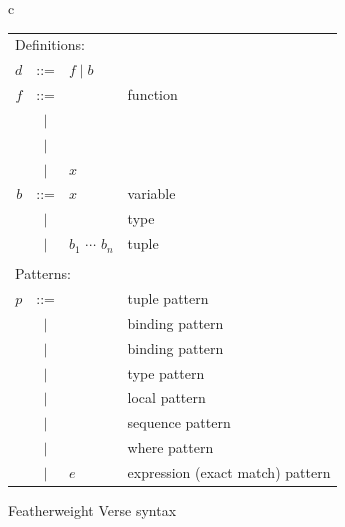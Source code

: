 \documentclass[acmsmall,review,anonymous,dvipsnames]{acmart}\settopmatter{printfolios=true,printccs=false,printacmref=false}
\newcommand{\vtt}[1]{\text{\tt #1}}
\newcommand{\eff}{\mathit{eff}}   %
\begin{document}
\begin{figure}
\begin{tabular}{c}
\begin{tabular}{rcll}
  \\
  \multicolumn{3}{l}{Definitions:} \\
  $d$ & ::= & $f \mid b$ \\
  $f$ & ::= & \vtt{$f$($p$)} & function \\
  & $\mid$ & \vtt{$f$ : $t$} \\
  & $\mid$ & \vtt{$f$ $\eff$} \\
  & $\mid$ & $x$ & \\
  $b$ & ::= & $x$ & variable \\
  & $\mid$ & \vtt{$b$ : $t$} & type \\
  & $\mid$ & $b_1$\vtt{,} $\cdots$\vtt{,} $b_n$ & tuple \\
  \\
  \multicolumn{3}{l}{Patterns:} \\
  $p$ & ::= & \vtt{$p_1$,$\cdots$,$p_n$} & tuple pattern \\
  & $\mid$ & \vtt{$d$ : $t$} & binding pattern \\
  & $\mid$ & \vtt{$d$ := $e$} & binding pattern \\
  & $\mid$ & \vtt{: $t$} & type pattern \\
  & $\mid$ & \vtt{let ($e$) in $p$} & local pattern \\
  & $\mid$ & \vtt{$e$ ; $p$} & sequence pattern \\
  & $\mid$ & \vtt{$p$ where $e$} & where pattern \\
  & $\mid$ & $e$ & expression (exact match) pattern \\
\end{tabular}
\end{tabular}
\caption{Featherweight Verse syntax} \label{fig:syntax}
\end{figure}
\end{document}
